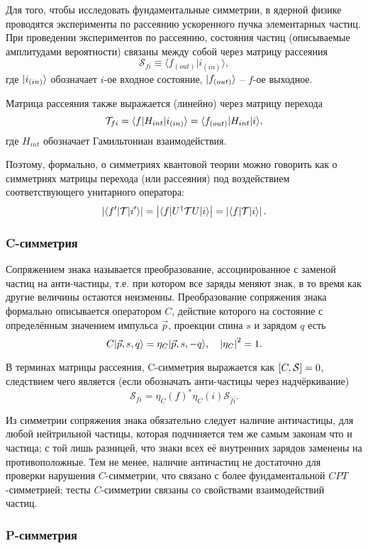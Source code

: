 \documentclass[14pt]{extarticle}
\newcommand{\SMatrix}{\mathcal{S}}
\newcommand{\TMatrix}{\mathcal{T}}
\newcommand{\ampl}[2]{\langle #1 \vert #2 \rangle}
\begin{document}
Для того, чтобы исследовать фундаментальные симметрии, в ядерной физике проводятся эксперименты по рассеянию ускоренного пучка элементарных частиц. При проведении экспериментов по рассеянию, состояния частиц (описываемые амплитудами вероятности) связаны между собой через матрицу рассеяния~\cite{Symmetries}
\[
\SMatrix_{fi} \equiv \ampl{f_{(out)}}{i_{(in)}},
\]
где $\vert{i_{(in)}}\rangle$ обозначает $i$-ое входное состояние, $\vert{f_{(out)}}\rangle$ -- $f$-ое выходное.

Матрица рассеяния также выражается (линейно) через матрицу перехода 
\[
\TMatrix_{fi} = \bra{f}H_{int}\ket{i_{(in)}} = \bra{f_{(out)}}H_{int}\ket{i},
\]
где $H_{int}$ обозначает Гамильтониан взаимодействия.

Поэтому, формально, о симметриях квантовой теории можно говорить как о симметриях матрицы перехода (или рассеяния) под воздействием соответствующего унитарного оператора:
\[
\Mod{\bra{f'}\TMatrix\ket{i'}} = \Mod{\bra{f}U^\dagger\TMatrix U\ket{i}} = \Mod{\bra{f}\TMatrix\ket{i}}.
\]


\subsubsection{C-симметрия}

Сопряжением знака называется преобразование, ассоциированное с заменой частиц на анти-частицы, т.е. при котором все заряды меняют знак, в то время как другие величины остаются неизменны. Преобразование сопряжения знака формально описывается оператором $C$, действие которого на состояние с определённым значением импульса $\vec{p}$, проекции спина $s$ и зарядом $q$ есть
\[
C\vert{\vec{p}, s, q}\rangle = \eta_C\vert{\vec{p}, s, -q}\rangle, \quad \left\vert{\eta_C}\right\vert^2 = 1.
\]

В терминах матрицы рассеяния, C-симметрия выражается как $\sqB{C,\SMatrix}=0$, следствием чего является (если обозначать анти-частицы через надчёркивание) 
\[
\SMatrix_{fi} = \eta_C(f)^*\eta_C(i)\SMatrix_{\bar{f}\bar{i}}.
\]

Из симметрии сопряжения знака обязательно следует наличие античастицы, для любой нейтрильной частицы, которая подчиняется тем же самым законам что и частица; с той лишь разницей, что знаки всех её внутренних зарядов заменены на противоположные. Тем не менее, наличие античастиц не достаточно для проверки нарушения $C$-симметрии, что связано с более фундаментальной $CPT$-симметрией; тесты $C$-симметрии связаны со свойствами взаимодействий частиц.~\cite[стр. 98]{Symmetries}

\subsubsection{P-симметрия}
\end{document}
